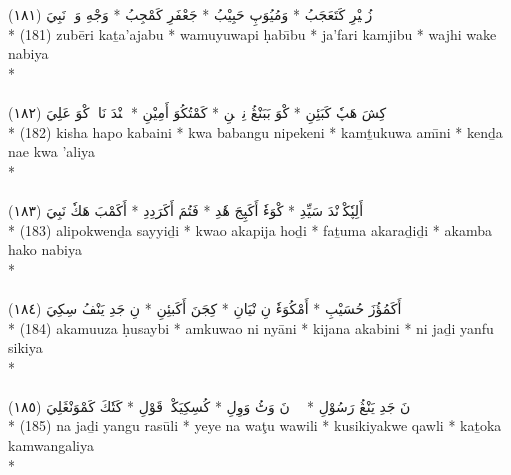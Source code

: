\documentclass[a4paper, 12pt]{report}
\begin{document}
\begin{center}
\textarabic{(١٨١) \textcolor{mygreen}{زُبٖيْرِ كَتَعَجَبُ  * وَمُيُوَپِ حَبِيْبُ  * جَعْفَرِ كَمْجِبُ  * وَجْهِ وَكٖ نَبِيَ }} \\* 
(181) zubēri kaṯa'ajabu  * wamuyuwapi ḥabı̄bu  * ja'fari kamjibu  * wajhi wake nabiya  \\* 
 \\ 
\\[8mm] 

\textarabic{(١٨٢) \textcolor{mygreen}{كِشَ هَپٗ كَبَئِنِ  * كْوَ بَبَنْڠُ نِپٖكٖنِ  * كَمْتُكُوَ أَمِيْنِ  * كٖنْدَ نَاءٖ كْوَ عَلِيَ }} \\* 
(182) kisha hapo kabaini  * kwa babangu nipekeni  * kamṯukuwa amı̄ni  * kenḏa nae kwa 'aliya  \\* 
 \\ 
\\[8mm] 

\textarabic{(١٨٣) \textcolor{mygreen}{أَلِپٗكْوٖنْدَ سَيِّدِ  * كْوَءٗ أَكَپِجَ هٗدِ  * فَتُمَ أَكَرَدِدِ  * أَكَمْبَ هَكٗ نَبِيَ }} \\* 
(183) alipokwenḏa sayyiḏi  * kwao akapija hoḏi  * faṯuma akaraḏiḏi  * akamba hako nabiya  \\* 
 \\ 
\\[8mm] 

\textarabic{(١٨٤) \textcolor{mygreen}{أَكَمُؤُزَ حُسَيْبِ  * أَمْكُوَءٗ نِ نْيَانِ  * كِجَنَ أَكَبئِنِ  * نِ جَدِ يَنْفُ سِكِيَ }} \\* 
(184) akamuuza ḥusaybi  * amkuwao ni nyāni  * kijana akabini  * ni jaḏi yanfu sikiya  \\* 
 \\ 
\\[8mm] 

\textarabic{(١٨٥) \textcolor{mygreen}{نَ جَدِ يَنْڠُ رَسُوْلِ  * يٖيٖ نَ وَٹُ وَوِلِ  * كُسِكِيَكْوٖ قَوْلِ  * كَتٗكَ كَمْوَنْڠَلِيَ }} \\* 
(185) na jaḏi yangu rasūli  * yeye na waţu wawili  * kusikiyakwe qawli  * kaṯoka kamwangaliya  \\* 
 \\ 
\\[8mm] 


\end{center}
\end{document}
